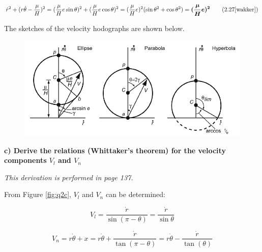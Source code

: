 \begin{equation}
    \dot{r}^2 + (r\dot{\theta} - \frac{\mu}{H})^2 = (\frac{\mu}{H} e\sin{\theta})^2 + (\frac{\mu}{H} e\cos{\theta})^2 = (\frac{\mu}{H}e)^2 (\sin{\theta}^2 + \cos{\theta}^2) = \boldsymbol{(\frac{\mu}{H}e)^2}
    \tag{2.27\cite{wakker}}
    \label{eq:q2_7}
\end{equation}

\noindent The sketches of the velocity hodographs are shown below.

\begin{figure}[ht]
    \centering
    \includegraphics[width=14cm]{img/velhodo.jpg}
    \label{fig:velhodo}
\end{figure}








\noindent \textbf{c) Derive the relations (Whittaker's theorem) for the velocity components $V_{l}$ and $V_{n}$}

\bigskip

\noindent \textit{This derivation is performed in \cite{wakker} page 137.}

\bigskip

\noindent From Figure \ref{fig:q2c}, $V_{l}$ and $V_{n}$ can be determined:

\begin{equation}
    V_{l} = \frac{\dot{r}}{\sin{(\pi - \theta)}} = \frac{\dot{r}}{\sin{\theta}}   
    \label{eq:q2_8}
\end{equation}

\begin{equation}
    V_{n} = r\dot{\theta} + x = r\dot{\theta} + \frac{\dot{r}}{\tan{(\pi - \theta)}} = r\dot{\theta} - \frac{\dot{r}}{\tan{(\theta)}}
    \label{eq:q2_9}
\end{equation}

